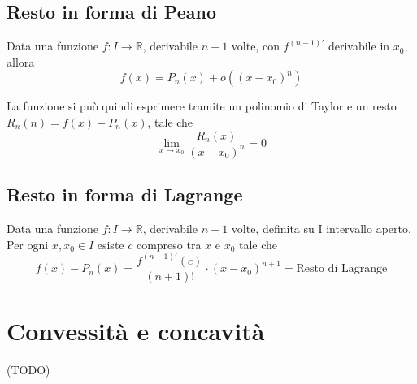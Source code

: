 \subsection{Resto in forma di Peano}

Data una funzione $f: I\to \mathbb{R}$, derivabile $n-1$ volte, con $f^{(n-1)\prime}$ derivabile in $x_0$, allora $$f(x)=P_n(x)+o((x-x_0)^n)$$

La funzione si può quindi esprimere tramite un polinomio di Taylor e un resto $R_n(n)=f(x)-P_n(x)$, tale che $$\lim_{x\to x_0} \frac{R_n(x)}{(x-x_0)^n}=0$$

\subsection{Resto in forma di Lagrange}

Data una funzione $f: I\to \mathbb{R}$, derivabile $n-1$ volte, definita su I intervallo aperto. Per ogni $x,x_0 \in I$ esiste $c$ compreso tra $x$ e $x_0$ tale che $$f(x)-P_n(x)=\frac{f^{(n+1)\prime}(c)}{(n+1)!}\cdot (x-x_0)^{n+1} = \text{Resto di Lagrange}$$ 

\section{Convessità e concavità}

(TODO)